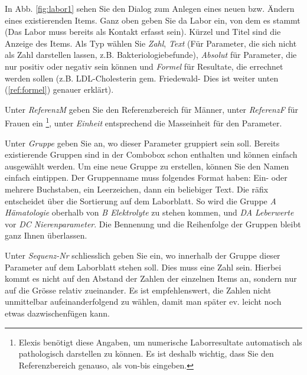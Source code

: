 In Abb. \ref{fig:labor1} sehen Sie den Dialog zum Anlegen eines neuen bzw. Ändern eines existierenden Items. Ganz oben geben Sie da Labor ein, von dem es stammt (Das Labor muss bereits als Kontakt erfasst sein). Kürzel und Titel sind die Anzeige des Items. Als Typ wählen Sie \textit{Zahl}, \textit{Text} (Für Parameter, die sich nicht als Zahl darstellen lassen, z.B. Bakteriologiebefunde), \textit{Absolut} für Parameter, die nur positiv oder negativ sein können und \textit{Formel} für Resultate, die errechnet werden sollen (z.B. LDL-Cholesterin gem. Friedewald- Dies ist weiter unten (\ref{ref:formel}) genauer erklärt).

Unter \textit{ReferenzM} geben Sie den Referenzbereich für Männer, unter \textit{ReferenzF} für Frauen ein \footnote{Elexis benötigt diese Angaben, um numerische Laborresultate automatisch als pathologisch darstellen zu können. Es ist deshalb wichtig, dass Sie den Referenzbereich genauso, als von-bis eingeben.}, unter \textit{Einheit} entsprechend die Masseinheit für den Parameter.

Unter \textit{Gruppe} geben Sie an, wo dieser Parameter gruppiert sein soll. Bereits existierende Gruppen sind in der Combobox schon enthalten und können einfach ausgewählt werden. Um eine neue Gruppe zu erstellen, können Sie den Namen einfach eintippen. Der Gruppenname muss folgendes Format haben:
Ein- oder mehrere Buchstaben, ein Leerzeichen, dann ein beliebiger Text. Die räfix entscheidet über die Sortierung auf dem Laborblatt. So wird die Gruppe  \textit{A Hämatologie} oberhalb von \textit{B Elektrolyte} zu stehen kommen, und \textit{DA Leberwerte} vor \textit{DC Nierenparameter}. Die Bennenung und die Reihenfolge der Gruppen bleibt ganz Ihnen überlassen.

Unter \textit{Sequenz-Nr} schliesslich geben Sie ein, wo innerhalb der Gruppe dieser Parameter auf dem Laborblatt stehen soll. Dies muss eine Zahl sein. Hierbei kommt es nicht auf den Abstand der Zahlen der einzelnen Items an, sondern nur auf die Grösse relativ zueinander. Es ist empfehlenswert, die Zahlen nicht unmittelbar aufeinanderfolgend zu wählen, damit man später ev. leicht noch etwas dazwischenfügen kann.


